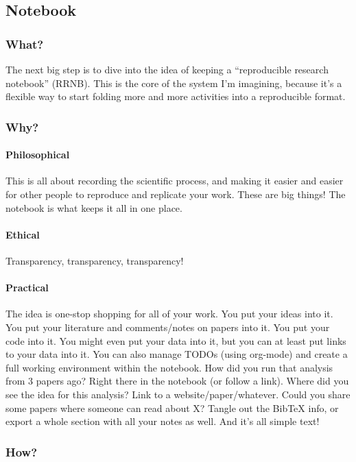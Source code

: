 \documentclass[11pt]{article}
\begin{document}
\subsection{Notebook}
\label{sec-3-3}
\subsubsection{What?}
\label{sec-3-3-1}

The next big step is to dive into the idea of keeping a ``reproducible research notebook'' (RRNB).  This is the core of the system I'm imagining, because it's a flexible way to start folding more and more activities into a reproducible format.
\subsubsection{Why?}
\label{sec-3-3-2}
\paragraph{Philosophical}
\label{sec-3-3-2-1}

This is all about recording the scientific process, and making it easier and easier for other people to reproduce and replicate your work.  These are big things!  The notebook is what keeps it all in one place.
\paragraph{Ethical}
\label{sec-3-3-2-2}

Transparency, transparency, transparency!
\paragraph{Practical}
\label{sec-3-3-2-3}

The idea is one-stop shopping for all of your work.  You put your ideas into it.  You put your literature and comments/notes on papers into it.  You put your code into it.  You might even put your data into it, but you can at least put links to your data into it. You can also manage TODOs (using org-mode) and create a full working environment within the notebook.  How did you run that analysis from 3 papers ago?  Right there in the notebook (or follow a link).  Where did you see the idea for this analysis?  Link to a website/paper/whatever.  Could you share some papers where someone can read about X?  Tangle out the BibTeX info, or export a whole section with all your notes as well. And it's all simple text!
\subsubsection{How?}
\label{sec-3-3-3}
\end{document}
